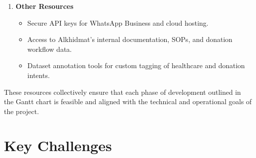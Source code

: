 \begin{enumerate}
    \item \textbf{Other Resources}
    \begin{itemize}
        \item Secure API keys for WhatsApp Business and cloud hosting.
        \item Access to Alkhidmat’s internal documentation, SOPs, and donation workflow data.
        \item Dataset annotation tools for custom tagging of healthcare and donation intents.
    \end{itemize}
\end{enumerate}

\noindent
These resources collectively ensure that each phase of development outlined in the Gantt chart is feasible and aligned with the technical and operational goals of the project.

\section{Key Challenges}


